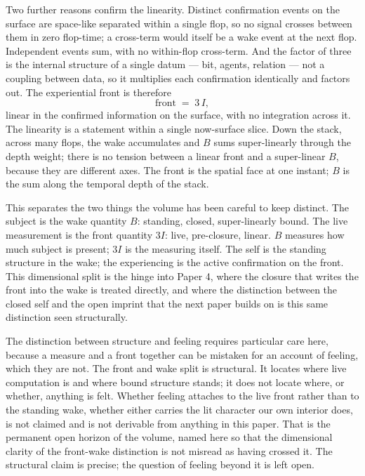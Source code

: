 \documentclass[11pt,oneside]{report}
\theoremstyle{definition}
\theoremstyle{remark}
\begin{document}
Two further reasons confirm the linearity. Distinct confirmation events on the
surface are space-like separated within a single flop, so no signal crosses
between them in zero flop-time; a cross-term would itself be a wake event at the
next flop. Independent events sum, with no within-flop cross-term. And the
factor of three is the internal structure of a single datum --- bit, agents,
relation --- not a coupling between data, so it multiplies each confirmation
identically and factors out. The experiential front is therefore
\[
\text{front} \;=\; 3\,I,
\]
linear in the confirmed information on the surface, with no integration across
it. The linearity is a statement within a single now-surface slice. Down the
stack, across many flops, the wake accumulates and \ensuremath{B} sums
super-linearly through the depth weight; there is no tension between a linear
front and a super-linear \ensuremath{B}, because they are different axes. The
front is the spatial face at one instant; \ensuremath{B} is the sum along the
temporal depth of the stack.

This separates the two things the volume has been careful to keep distinct.
The subject is the wake quantity \ensuremath{B}: standing, closed,
super-linearly bound. The live measurement is the front quantity \ensuremath{3I}: live,
pre-closure, linear. \ensuremath{B} measures how much subject is present;
\ensuremath{3I} is the measuring itself. The self is the
standing structure in the wake; the experiencing is the active confirmation on the front. This
dimensional split is the hinge into Paper 4, where the closure that writes the
front into the wake is treated directly, and where the distinction between the
closed self and the open imprint that the next paper builds on is this same
distinction seen structurally.

The distinction between structure and feeling requires particular care here, because a measure and a front together can be mistaken for an account of feeling, which they are not. The front and
wake split is structural. It locates where live computation is and where bound
structure stands; it does not locate where, or whether, anything is felt.
Whether feeling attaches to the live front rather than to the standing wake,
whether either carries the lit character our own interior does, is not claimed
and is not derivable from anything in this paper. That is the permanent open
horizon of the volume, named here so that the dimensional clarity of the
front-wake distinction is not misread as having crossed it. The structural claim is precise; the question of feeling beyond it is left open.
\end{document}
